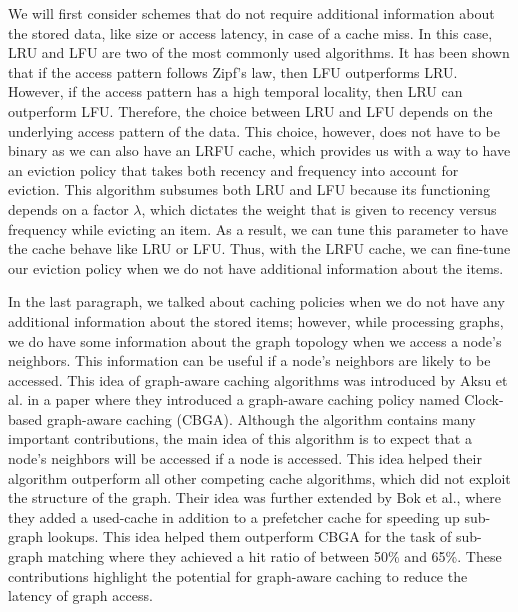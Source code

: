 \medskip
We will first consider schemes that do not require additional information about
the stored data, like size or access latency, in case of a cache miss. In
this case, LRU and LFU are two of the most commonly used algorithms. It has been
shown that if the access pattern follows Zipf's law\cite{zipf1929relative}, then
LFU outperforms LRU. However, if the access pattern has a high temporal locality,
then LRU can outperform LFU. Therefore, the choice between LRU and LFU depends
on the underlying access pattern of the data. This choice, however, does not
have to be binary as we can also have an LRFU cache\cite{lee2001lrfu}, which
provides us with a way to have an eviction policy that takes both recency and
frequency into account for eviction. This algorithm subsumes both LRU and LFU
because its functioning depends on a factor $\lambda$, which dictates the
weight that is given to recency versus frequency while evicting an item. As a
result, we can tune this parameter to have the cache behave like LRU or LFU.
Thus, with the LRFU cache, we can fine-tune our eviction policy when we do not
have additional information about the items.

\medskip
In the last paragraph, we talked about caching policies when we do not have any
additional information about the stored items; however, while processing
graphs, we do have some information about the graph topology when we access a
node's neighbors. This information can be useful if a node's neighbors are
likely to be accessed. This idea of graph-aware
caching algorithms was introduced by Aksu et al. in a paper where they
introduced a graph-aware caching policy named Clock-based graph-aware
caching (CBGA)\cite{aksu2015graph}. Although the algorithm contains many 
important contributions, the
main idea of this algorithm is to expect that a node's neighbors will be
accessed if a node is accessed. This idea helped their algorithm outperform all
other competing cache algorithms, which did not exploit the structure of the
graph. Their idea was further extended by Bok et al.\cite{bok2020memory}, where
they added a used-cache in addition to a prefetcher cache for speeding up
sub-graph lookups. This idea helped them outperform CBGA for the task of sub-graph
matching where they achieved a hit ratio of between 50\% and 65\%. 
These contributions highlight the potential for graph-aware caching to
reduce the latency of graph access.
